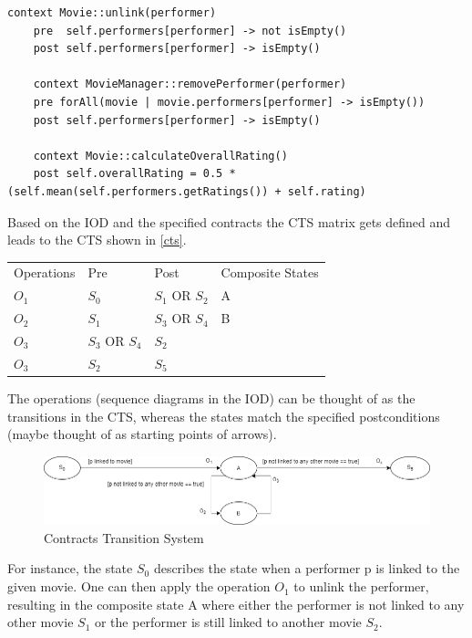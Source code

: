 \begin{lstlisting}[caption={Contracts written in OCL},label={contracts2}]
	context Movie::unlink(performer)
	pre  self.performers[performer] -> not isEmpty()
	post self.performers[performer] -> isEmpty()
	
	context MovieManager::removePerformer(performer)
	pre forAll(movie | movie.performers[performer] -> isEmpty())
	post self.performers[performer] -> isEmpty()
	
	context Movie::calculateOverallRating()
	post self.overallRating = 0.5 * (self.mean(self.performers.getRatings()) + self.rating)
\end{lstlisting}

Based on the IOD and the specified contracts the CTS matrix gets defined and leads to the CTS shown in \autoref{cts}.

\begin{longtable}[h]{llll}
	Operations & Pre & Post & Composite States \\
	$O_{1}$ & $S_{0}$ & $S_{1}$ OR $S_{2}$ & A \\
	$O_{2}$ & $S_{1}$ & $S_{3}$ OR $S_{4}$ & B \\
	$O_{3}$ & $S_{3}$ OR $S_{4}$ & $S_{2}$ & \\
	$O_{3}$ & $S_{2}$ & $S_{5}$ & \\
\end{longtable}

The operations (sequence diagrams in the IOD) can be thought of as the transitions in the CTS, whereas the states match the specified postconditions (maybe thought of as starting points of arrows).

\begin{figure}[h]
	\centering
	\includegraphics[width=\textwidth]{../images/topic3_cts.png}
	\caption{Contracts Transition System}
	\label{cts}
\end{figure}

For instance, the state $S_{0}$ describes the state when a performer p is linked to the given movie. One can then apply the operation $O_{1}$ to unlink the performer, resulting in the composite state A where either the performer is not linked to any other movie $S_{1}$ or the performer is still linked to another movie $S_{2}$.


